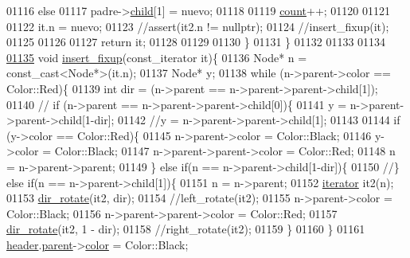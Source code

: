 \begin{DoxyCode}
01116         \textcolor{keywordflow}{else}
01117             padre->\hyperlink{structaed2_1_1map_1_1Node_acac3478cefbd8bebe0c3f3abb9a2935e_acac3478cefbd8bebe0c3f3abb9a2935e}{child}[1] = nuevo;
01118         
01119         \hyperlink{classaed2_1_1map_a44236c4f16cdc20a10759862b198bde4_a44236c4f16cdc20a10759862b198bde4}{count}++;
01120     
01121     
01122         it.n = nuevo;
01123         \textcolor{comment}{//assert(it2.n != nullptr);}
01124         \textcolor{comment}{//insert\_fixup(it);}
01125      
01126         
01127         \textcolor{keywordflow}{return} it;
01128 
01129     
01130     \}
01131  \}
01132 
01133 
01134     
\hyperlink{classaed2_1_1map_ae4e5e735407f463bade9eeab6a553c53_ae4e5e735407f463bade9eeab6a553c53}{01135} \textcolor{keywordtype}{void} \hyperlink{classaed2_1_1map_ae4e5e735407f463bade9eeab6a553c53_ae4e5e735407f463bade9eeab6a553c53}{insert\_fixup}(const\_iterator it)\{
01136     Node* n = \textcolor{keyword}{const\_cast<}Node*\textcolor{keyword}{>}(it.n);
01137     Node* y;
01138     \textcolor{keywordflow}{while} (n->parent->color == Color::Red)\{
01139         \textcolor{keywordtype}{int} dir = (n->parent == n->parent->parent->child[1]);
01140     \textcolor{comment}{//  if (n->parent == n->parent->parent->child[0])\{}
01141         y = n->parent->parent->child[1-dir];
01142         \textcolor{comment}{//y = n->parent->parent->child[1];}
01143         
01144         \textcolor{keywordflow}{if} (y->color == Color::Red)\{
01145             n->parent->color = Color::Black;
01146             y->color = Color::Black;
01147             n->parent->parent->color = Color::Red;
01148             n = n->parent->parent;
01149         \} \textcolor{keywordflow}{else} \textcolor{keywordflow}{if}(n == n->parent->child[1-dir])\{
01150             \textcolor{comment}{//\} else if(n == n->parent->child[1])\{}
01151             n = n->parent;
01152             \hyperlink{classaed2_1_1iterator}{iterator} it2(n);
01153             \hyperlink{classaed2_1_1map_a94f2862ada0c9ed4f4457eac42ea8f23_a94f2862ada0c9ed4f4457eac42ea8f23}{dir\_rotate}(it2, dir);
01154                 \textcolor{comment}{//left\_rotate(it2);}
01155             n->parent->color = Color::Black;
01156             n->parent->parent->color = Color::Red;
01157             \hyperlink{classaed2_1_1map_a94f2862ada0c9ed4f4457eac42ea8f23_a94f2862ada0c9ed4f4457eac42ea8f23}{dir\_rotate}(it2, 1 - dir);
01158                 \textcolor{comment}{//right\_rotate(it2);}
01159         \}
01160     \}
01161         \hyperlink{classaed2_1_1map_a92d93f905c8ad73fba18fdc7e8915cce_a92d93f905c8ad73fba18fdc7e8915cce}{header}.\hyperlink{structaed2_1_1map_1_1Node_a91a1855da19d22344bc89c2f8b998a7a_a91a1855da19d22344bc89c2f8b998a7a}{parent}->\hyperlink{structaed2_1_1map_1_1Node_a58dd9993fee8ee3eaa5716b72a3eca47_a58dd9993fee8ee3eaa5716b72a3eca47}{color} = Color::Black;

\end{DoxyCode}
